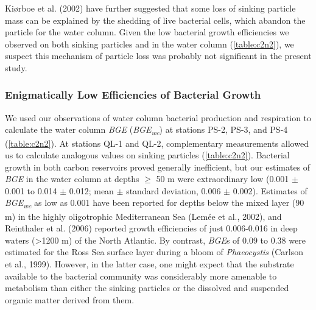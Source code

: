 Ki\o{}rboe et al. (2002) have further suggested that some loss of sinking particle mass can be explained by the shedding of live bacterial cells, which abandon the particle for the water column. Given the low bacterial growth efficiencies we observed on both sinking particles and in the water column (\autoref{table:c2n2}), we suspect this mechanism of particle loss was probably not significant in the present study.

\subsubsection{Enigmatically Low Efficiencies of Bacterial Growth}
\label{sssec:Enigmatically Low Efficiencies of Bacterial Growth}

We used our observations of water column bacterial production and respiration to calculate the water column \emph{BGE} (\emph{BGE\textsubscript{wc}}) at stations PS-2, PS-3, and PS-4 (\autoref{table:c2n2}). At stations QL-1 and QL-2, complementary measurements allowed us to calculate analogous values on sinking particles (\autoref{table:c2n2}). Bacterial growth in both carbon reservoirs proved generally inefficient, but our estimates of \emph{BGE} in the water column at depths $\geq$ 50 m were extraordinary low (0.001 $\pm$ 0.001 to 0.014 $\pm$ 0.012; mean $\pm$ standard deviation, 0.006 $\pm$ 0.002). Estimates of \emph{BGE\textsubscript{wc}} as low as 0.001 have been reported for depths below the mixed layer (90 m) in the highly oligotrophic Mediterranean Sea (Lem\'{e}e et al., 2002), and Reinthaler et al. (2006) reported growth efficiencies of just 0.006-0.016 in deep waters (\textgreater{}1200 m) of the North Atlantic. By contrast, \emph{BGE}s of 0.09 to 0.38 were estimated for the Ross Sea surface layer during a bloom of \emph{Phaeocystis} (Carlson et al., 1999). However, in the latter case, one might expect that the substrate available to the bacterial community was considerably more amenable to metabolism than either the sinking particles or the dissolved and suspended organic matter derived from them.

